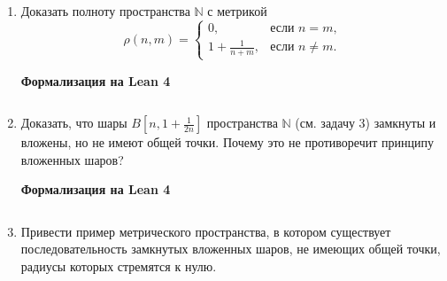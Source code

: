 \documentclass[12pt,a4paper]{article}
\begin{document}
\begin{enumerate}
\begin{center}\small\textbf{Формализация на Lean 4}\end{center}
\inputminted{lean}{FunAn/Section08_CompleteMetric/Task02.lean}

\newpage
\item Доказать полноту пространства $\mathbb{N}$ с метрикой
$$\rho(n, m) =
\begin{cases} 0, & \text{если } n=m, \\ 1 + \frac{1}{n+m}, & \text{если } n \ne m.
\end{cases}$$


\begin{center}\small\textbf{Формализация на Lean 4}\end{center}
\inputminted{lean}{FunAn/Section08_CompleteMetric/Task03.lean}

\newpage
\item Доказать, что шары $B[n, 1+\frac{1}{2n}]$ пространства $\mathbb{N}$ (см. задачу 3) замкнуты и вложены, но не имеют общей точки. Почему это не противоречит принципу вложенных шаров?


\begin{center}\small\textbf{Формализация на Lean 4}\end{center}
\inputminted{lean}{FunAn/Section08_CompleteMetric/Task04.lean}

\newpage

\item Привести пример метрического пространства, в котором существует последовательность замкнутых вложенных шаров, не имеющих общей точки, радиусы которых стремятся к нулю.


\end{enumerate}
\end{document}
